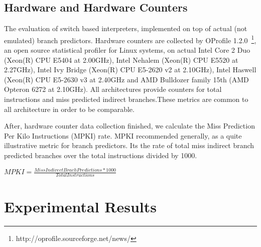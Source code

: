 \documentclass[parskip=full, paper=a4, fontsize=12pt]{scrartcl} %
\numberwithin{equation}{section}
\numberwithin{figure}{section}
\numberwithin{table}{section}
\begin{document}
\subsection{Hardware and Hardware Counters}
The evaluation of switch based interpreters, implemented on top of
actual (not emulated) branch predictors. Hardware counters are
collected by OProfile
1.2.0~\footnote{http://oprofile.sourceforge.net/news/}, an open source
statistical profiler for Linux systems, on actual Intel Core 2 Duo
(Xeon(R) CPU E5404 at 2.00GHz), Intel Nehalem (Xeon(R) CPU E5520 at
2.27GHz), Intel Ivy Bridge (Xeon(R) CPU E5-2620 v2 at 2.10GHz), Intel
Haswell (Xeon(R) CPU E5-2630 v3 at 2.40GHz and AMD Bulldozer family
15th (AMD Opteron 6272 at 2.10GHz). All architectures provide counters
for total instructions and miss predicted indirect branches.These
metrics are common to all architecture in order to be comparable.


After, hardware counter data collection finished, we calculate the
Miss Prediction Per Kilo Instructions (MPKI) rate. MPKI recommended
generally, as a quite illustrative metric for branch predictors. Its
the rate of total miss indirect branch predicted branches over the
total instructions divided by 1000.
\begin{center}
   $ MPKI = \frac{Miss Indirect Brach Predictions * 1000}{Total Instructions} $
\end{center}

\section{Experimental Results}


\newpage


\end{document}
